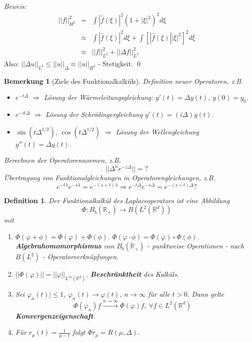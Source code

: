 \documentclass[12pt]{extreport} %
\newtheorem{Definition}[Satz]{Definition}
\newtheorem{Bemerkung}[Satz]{Bemerkung}
\numberwithin{equation}{section}
\newcommand{\R}{\mathbb{R}} %
\newcommand{\f}{\hat{f}}
\newcommand{\m}{\cdot}
\newcommand{\Bew}{\emph{Beweis: }}
\begin{document}
	\Bew 
	\begin{eqnarray}
		||f||_{H^2}^2 &=& \int |\f(\xi)|^2(1+|\xi|^2)^2 d\xi\nonumber\\
		&\approx& \int |\f(\xi)|^2d\xi + \int\left[|\f(\xi)||\xi|^2 \right]^2d\xi\nonumber\\
		&\approx& ||f||_{L^2}^2 + ||\Delta f||_{L^2}^2\nonumber
	\end{eqnarray}
	Also: $||\Delta u||_{L^2} \leq ||u||_\Delta\approx ||u||_{H^2}$ - Stetigkeit.
	\qed
	
	\begin{Bemerkung}[Ziele des Funktionalkalküls]
		Definition neuer Operatoren, z.B.
		\begin{itemize}
			\item $e^{-t\Delta}$ $\Rightarrow$ Lösung der Wärmeleitungsgleichung: $y'(t)=\Delta y(t)$, $y(0) = y_0$.
			\item $e^{-i t\Delta}$ $\Rightarrow$ Lösung der Schrödingergleichung $y'(t) = (i\Delta) y(t)$.
			\item $\sin(t\Delta^{1/2})$, $\cos(t\Delta^{1/2})$ $\Rightarrow$ Lösung der Wellengleichung $y''(t) = \Delta y(t)$.
		\end{itemize}
		Berechnen der Operatorennormen, z.B.
		$$||\Delta^n e^{-z\Delta}|| = ?$$
		Übertragung von Funktionalgleichungen in Operatorengleichungen, z.B. 
		$$e^{-t\lambda}e^{-s\lambda} = e^{-(s+t)\lambda} \Rightarrow e^{-t\Delta}e^{-s\Delta} = e^{-(s+t)\Delta} ?$$
	\end{Bemerkung}
	
	\begin{Definition}
		Der Funktionalkalkül des Laplaceoperators ist eine Abbildung
		$$\Phi: B_b(\R_+)\rightarrow B(L^2(\R^d))$$
		mit
		\begin{enumerate}
			\item[(i)] $\Phi(\varphi +\phi) = \Phi(\varphi)+ \Phi(\phi)$. $\Phi(\varphi\m \phi) = \Phi(\varphi)\circ\Phi(\phi)$. \textbf{Algebrahomomorphismus} von $B_b(\R_+)$ - punktweise Operationen - nach $B(L^2)$ - Operatorverknüpfungen.
			\item[(ii)] $||\Phi(\varphi)|| = ||\varphi||_{L^{\infty}(\R^d)}$. \textbf{Beschränktheit} des Kalküls.
			\item[(iii)] Sei $\varphi_n(t)|\leq 1$, $\varphi_n(t)\rightarrow \varphi(t)$, $n\rightarrow\infty$ für alle $t>0$. Dann gelte
			$$\Phi(\varphi_n)f\overset{n\rightarrow\infty}{\longrightarrow} \Phi(\varphi)f, ~\forall f\in L^2(\R^d)$$
			\textbf{Konvergenzeigenschaft}.
			\item[(iv)] Für $r_\mu(t) =\frac{1}{\mu-t}$ folgt $\Phi r_\mu = R(\mu, \Delta)$.
		\end{enumerate}
	\end{Definition}
	
\end{document}
